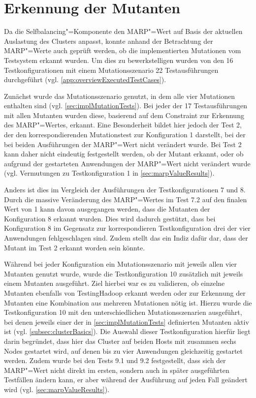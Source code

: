 \section{Erkennung der Mutanten}
\label{sec:killingMutants}

Da die Selfbalancing"=Komponente den \gls{MARP}"=Wert auf Basis der aktuellen Auslastung des Clusters anpasst, konnte anhand der Betrachtung der \gls{MARP}"=Werte auch geprüft werden, ob die implementierten Mutationen vom Testsystem erkannt wurden.
Um dies zu bewerkstelligen wurden von den 16 Testkonfigurationen mit einem Mutationsszenario 22 Testausführungen durchgeführt (vgl. \cref{app:overviewExecutedTestCases}).

Zunächst wurde das Mutationsszenario genutzt, in dem alle vier Mutationen enthalten sind (vgl. \cref{sec:implMutationTests}).
Bei jeder der 17 Testausführungen mit allen Mutanten wurden diese, basierend auf dem Constraint zur Erkennung des \gls{MARP}"=Wertes, erkannt.
Eine Besonderheit bildet hier jedoch der Test 2, der den korrespondierenden Mutationstest zur Konfiguration 1 darstellt, bei der bei beiden Ausführungen der \gls{MARP}"=Wert nicht verändert wurde.
Bei Test 2 kann daher nicht eindeutig festgestellt werden, ob der Mutant erkannt, oder ob aufgrund der gestarteten Anwendungen der \gls{MARP}"=Wert nicht verändert wurde (vgl. Vermutungen zu Testkonfiguration 1 in \cref{sec:marpValueResults}).

Anders ist dies im Vergleich der Ausführungen der Testkonfigurationen 7 und 8.
Durch die massive Veränderung des \gls{MARP}"=Wertes im Test 7.2 auf den finalen Wert von 1 kann davon ausgegangen werden, dass die Mutanten der Konfiguration 8 erkannt wurden.
Dies wird dadurch gestützt, dass bei Konfiguration 8 im Gegensatz zur korrespondieren Testkonfiguration drei der vier Anwendungen fehlgeschlagen sind.
Zudem stellt das ein Indiz dafür dar, dass der Mutant im Test 2 erkannt worden sein könnte.

Während bei jeder Konfiguration ein Mutationsszenario mit jeweils allen vier Mutanten genutzt wurde, wurde die Testkonfiguration 10 zusätzlich mit jeweils einem Mutanten ausgeführt.
Ziel hierbei war es zu validieren, ob einzelne Mutanten ebenfalls von TestingHadoop erkannt werden oder zur Erkennung der Mutanten eine Kombination aus mehreren Mutationen nötig ist.
Hierzu wurde die Testkonfiguration 10 mit den unterschiedlichen Mutationsszenarien ausgeführt, bei denen jeweils einer der in \cref{sec:implMutationTests} definierten Mutanten aktiv ist (vgl. \cref{subsec:clusterBasics}).
Die Auswahl dieser Testkonfiguration hierfür liegt darin begründet, dass hier das Cluster auf beiden Hosts mit zusammen sechs Nodes gestartet wird, auf denen bis zu vier Anwendungen gleichzeitig gestartet werden.
Zudem wurde bei den Tests 9.1 und 9.2 festgestellt, dass sich der \gls{MARP}"=Wert nicht direkt im ersten, sondern auch in später ausgeführten Testfällen ändern kann, er aber während der Ausführung auf jeden Fall geändert wird (vgl. \cref{sec:marpValueResults}).

